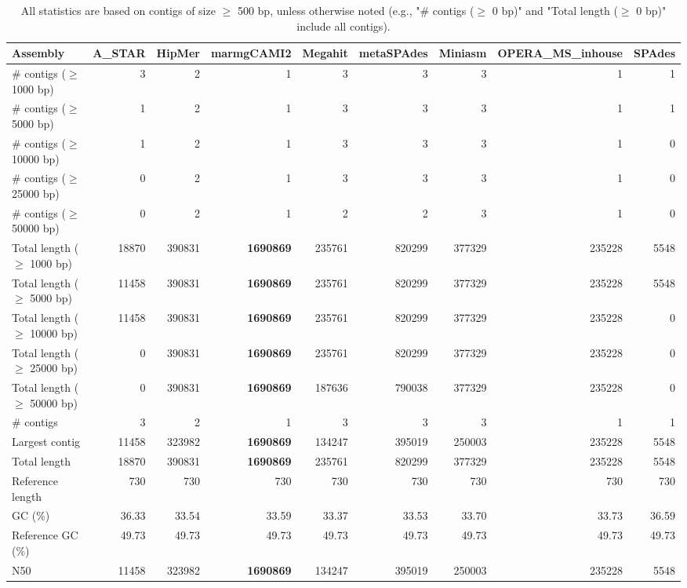 \documentclass[12pt,a4paper]{article}
\begin{document}
\begin{table}[ht]
\begin{center}
\caption{All statistics are based on contigs of size $\geq$ 500 bp, unless otherwise noted (e.g., "\# contigs ($\geq$ 0 bp)" and "Total length ($\geq$ 0 bp)" include all contigs).}
\begin{tabular}{|l*{8}{|r}|}
\hline
Assembly & A\_STAR & HipMer & marmgCAMI2 & Megahit & metaSPAdes & Miniasm & OPERA\_MS\_inhouse & SPAdes \\ \hline
\# contigs ($\geq$ 1000 bp) & 3 & 2 & 1 & 3 & 3 & 3 & 1 & 1 \\ \hline
\# contigs ($\geq$ 5000 bp) & 1 & 2 & 1 & 3 & 3 & 3 & 1 & 1 \\ \hline
\# contigs ($\geq$ 10000 bp) & 1 & 2 & 1 & 3 & 3 & 3 & 1 & 0 \\ \hline
\# contigs ($\geq$ 25000 bp) & 0 & 2 & 1 & 3 & 3 & 3 & 1 & 0 \\ \hline
\# contigs ($\geq$ 50000 bp) & 0 & 2 & 1 & 2 & 2 & 3 & 1 & 0 \\ \hline
Total length ($\geq$ 1000 bp) & 18870 & 390831 & {\bf 1690869} & 235761 & 820299 & 377329 & 235228 & 5548 \\ \hline
Total length ($\geq$ 5000 bp) & 11458 & 390831 & {\bf 1690869} & 235761 & 820299 & 377329 & 235228 & 5548 \\ \hline
Total length ($\geq$ 10000 bp) & 11458 & 390831 & {\bf 1690869} & 235761 & 820299 & 377329 & 235228 & 0 \\ \hline
Total length ($\geq$ 25000 bp) & 0 & 390831 & {\bf 1690869} & 235761 & 820299 & 377329 & 235228 & 0 \\ \hline
Total length ($\geq$ 50000 bp) & 0 & 390831 & {\bf 1690869} & 187636 & 790038 & 377329 & 235228 & 0 \\ \hline
\# contigs & 3 & 2 & 1 & 3 & 3 & 3 & 1 & 1 \\ \hline
Largest contig & 11458 & 323982 & {\bf 1690869} & 134247 & 395019 & 250003 & 235228 & 5548 \\ \hline
Total length & 18870 & 390831 & {\bf 1690869} & 235761 & 820299 & 377329 & 235228 & 5548 \\ \hline
Reference length & 730 & 730 & 730 & 730 & 730 & 730 & 730 & 730 \\ \hline
GC (\%) & 36.33 & 33.54 & 33.59 & 33.37 & 33.53 & 33.70 & 33.73 & 36.59 \\ \hline
Reference GC (\%) & 49.73 & 49.73 & 49.73 & 49.73 & 49.73 & 49.73 & 49.73 & 49.73 \\ \hline
N50 & 11458 & 323982 & {\bf 1690869} & 134247 & 395019 & 250003 & 235228 & 5548 \\ \hline

\end{tabular}
\end{center}
\end{table}
\end{document}
